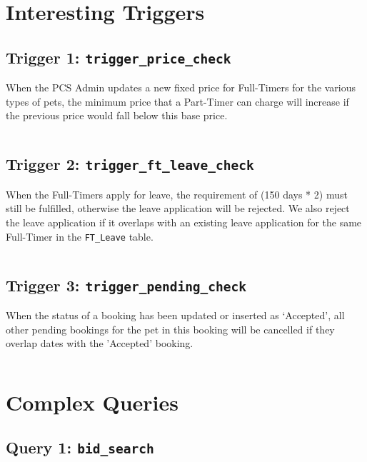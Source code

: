 \documentclass[10pt]{article}
\begin{document}
\section{Interesting Triggers}
\subsection{Trigger 1: \texttt{trigger\_price\_check}}
When the PCS Admin updates a new fixed price for Full-Timers for the various types of pets, the minimum price that a Part-Timer can charge will increase if the previous price would fall below this base price.
\begin{figure}[H]
\inputminted[breaklines, tabsize=8, obeytabs, fontsize=\footnotesize]{postgresql}{./codes/trigger_price_check.sql}
\end{figure}

\newpage
\subsection{Trigger 2: \texttt{trigger\_ft\_leave\_check}}
When the Full-Timers apply for leave, the requirement of (150 days * 2) must still be fulfilled, otherwise the leave application will be rejected. We also reject the leave application if it overlaps with an existing leave application for the same Full-Timer in the \texttt{FT\_Leave} table.
\begin{figure}[H]
\inputminted[breaklines, tabsize=8, obeytabs, fontsize=\footnotesize]{postgresql}{./codes/trigger_ft_leave_check.sql}
\end{figure}

\newpage
\subsection{Trigger 3: \texttt{trigger\_pending\_check}}
When the status of a booking has been updated or inserted as `Accepted', all other pending bookings for the pet in this booking will be cancelled if they overlap dates with the 'Accepted' booking.
\begin{figure}[H]
\inputminted[breaklines, tabsize=8, obeytabs, fontsize=\footnotesize]{postgresql}{./codes/trigger_pending_check.sql}
\end{figure}


\section{Complex Queries}

\subsection{Query 1: \texttt{bid\_search}}
\begin{figure}[H]
\inputminted[breaklines, tabsize=8, obeytabs, fontsize=\footnotesize]{postgresql}{./codes/query_bid_search.sql}
\end{figure}
\end{document}
